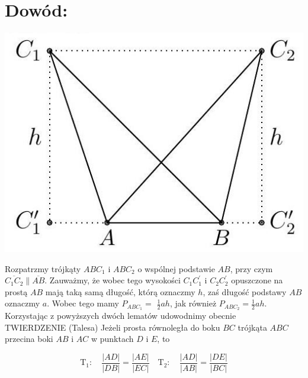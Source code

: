 \documentclass[10pt]{article}
\begin{document}
\section*{Dowód:}
\begin{center}
\includegraphics[max width=\textwidth]{2024_11_21_e9b4faa005d5be2cc318g-006(1)}
\end{center}

Rozpatrzmy trójkąty \(A B C_{1}\) i \(A B C_{2}\) o wspólnej podstawie \(A B\), przy czym \(\overline{C_{1} C_{2}} \| \overline{A B}\). Zauważmy, że wobec tego wysokości \(C_{1} C_{1}^{\prime}\) i \(C_{2} C_{2}^{\prime}\) opuszczone na prostą \(A B\) mają taką samą długość, którą oznaczmy \(h\), zaś długość podstawy \(A B\) oznaczmy \(a\). Wobec tego mamy \(P_{A B C_{1}}=\) \(\frac{1}{2} a h\), jak również \(P_{A B C_{2}}=\frac{1}{2} a h\).\\
Korzystając z powyższych dwóch lematów udowodnimy obecnie\\
TWIERDZENIE (Talesa) Jeżeli prosta równoległa do boku \(B C\) trójkąta \(A B C\) przecina boki \(A B\) i \(A C\) w punktach \(D\) i \(E\), to

\[
\mathrm{T}_{1}: \quad \frac{|A D|}{|D B|}=\frac{|A E|}{|E C|} \quad \mathrm{T}_{2}: \quad \frac{|A D|}{|A B|}=\frac{|D E|}{|B C|}
\]
\end{document}
